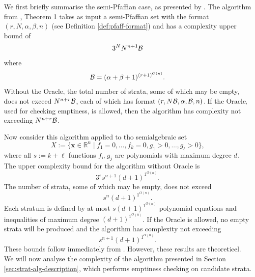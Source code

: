 \documentclass[
]{book}
\theoremstyle{definition}
\theoremstyle{definition}
\theoremstyle{definition}
\theoremstyle{definition}
\theoremstyle{remark}
\begin{document}
We first briefly summarise the semi-Pfaffian case, as presented by \citet{gv1995}.
The algorithm from \citet{gv1995}, Theorem 1 takes as input a semi-Pfaffian set with the format \((r, N, \alpha, \beta, n)\) (see Definition \ref{def:pfaff-format}) and has a complexity upper bound of
\[
3^N N^{n+1} {\cal B}
\]
where
\[
{\cal B} = (\alpha + \beta + 1)^{(r+1)^{O(n)}}.
\]
Without the Oracle, the total number of strata, some of which may be empty, does not exceed \(N^{n+r}{\cal B}\), each of which has format \((r, N{\cal B},\alpha, {\cal B}, n)\).
If the Oracle, used for checking emptiness, is allowed, then the algorithm has complexity not exceeding \(N^{n+r}{\cal B}\).

Now consider this algorithm applied to tho semialgebraic set
\begin{equation}
X := \{ \mathbf{x} \in \mathbb{R}^n \mid f_1 = 0, \ldots, f_k = 0, g_1 > 0, \ldots, g_\ell > 0 \},
\label{eq:strat-imput-set}
\end{equation}
where all \(s := k + \ell\) functions \(f_i,g_j\) are polynomials with maximum degree \(d\).
The upper complexity bound for the algorithm without Oracle is
\[
3^{s} s^{n+1} (d + 1)^{1^{O(n)}}.
\]
The number of strata, some of which may be empty, does not exceed
\[s^{n} (d + 1)^{1^{O(n)}}.\]
Each stratum is defined by at most \(s (d + 1)^{1^{O(n)}}\) polynomial equations and inequalities of maximum degree \((d + 1)^{1^{O(n)}}\).
If the Oracle is allowed, no empty strata will be produced and the algorithm has complexity not exceeding
\[
s^{n+1} (d + 1)^{1^{O(n)}}.
\]
These bounds follow immediately from \citet{gv1995}.
However, these results are theoreticel. We will now analyse the complexity of the algorithm presented in Section \ref{sec:strat-alg-description}, which performs emptiness checking on candidate strata.
\end{document}
